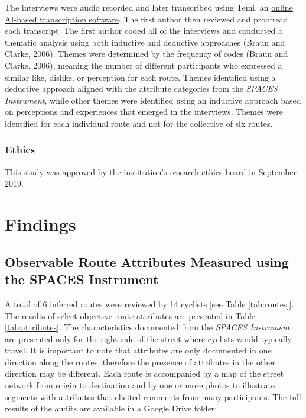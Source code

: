 \documentclass[]{elsarticle} %
\begin{document}
The interviews were audio recorded and later transcribed using Temi, an
\href{https://www.temi.com/}{online AI-based transcription software}.
The first author then reviewed and proofread each transcript. The first
author coded all of the interviews and conducted a thematic analysis
using both inductive and deductive approaches (Braun and Clarke, 2006).
Themes were determined by the frequency of codes (Braun and Clarke,
2006), meaning the number of different participants who expressed a
similar like, dislike, or perception for each route. Themes identified
using a deductive approach aligned with the attribute categories from
the \emph{SPACES Instrument}, while other themes were identified using
an inductive approach based on perceptions and experiences that emerged
in the interviews. Themes were identified for each individual route and
not for the collective of six routes.

\hypertarget{ethics}{%
\subsubsection{Ethics}\label{ethics}}

This study was approved by the institution's research ethics board in
September 2019.

\hypertarget{sec:findings}{%
\section{Findings}\label{sec:findings}}

\hypertarget{observable-route-attributes-measured-using-the-spaces-instrument}{%
\subsection{Observable Route Attributes Measured using the SPACES
Instrument}\label{observable-route-attributes-measured-using-the-spaces-instrument}}

A total of 6 inferred routes were reviewed by 14 cyclists {[}see Table
\ref{tab:routes}{]}. The results of select objective route attributes
are presented in Table \ref{tab:attributes}. The characteristics
documented from the \emph{SPACES Instrument} are presented only for the
right side of the street where cyclists would typically travel. It is
important to note that attributes are only documented in one direction
along the routes, therefore the presence of attributes in the other
direction may be different. Each route is accompanied by a map of the
street network from origin to destination and by one or more photos to
illustrate segments with attributes that elicited comments from many
participants. The full results of the audits are available in a Google
Drive folder:
\end{document}
